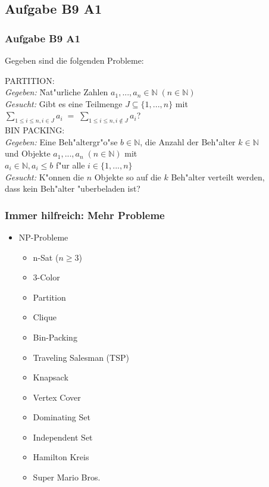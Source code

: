 \subsection{Aufgabe B9 A1}
\begin{frame}
	\frametitle{Aufgabe B9 A1}
	Gegeben sind die folgenden Probleme:
	\begin{tabbing}
	PARTITION:\\
	\textit{Gegeben:} \= Nat"urliche Zahlen $a_1,...,a_n \in \mathbb{N} \; (n \in
	\mathbb{N})$\\
	\textit{Gesucht:} \> Gibt es eine Teilmenge $J \subseteq \{1,...,n\}$ mit\\
	\> $\sum\limits_{1 \leq i \leq n, i \in J}a_i \; = \;
	\sum\limits_{1 \leq i \leq n, i \notin J}a_i$?\\[8pt]
	BIN PACKING:\\
	\textit{Gegeben:} \> Eine Beh"altergr"o"se $b \in \mathbb{N}$, die Anzahl der
	Beh"alter $k \in \mathbb{N}$\\
	\> und Objekte $a_1,...,a_n \; (n \in \mathbb{N})$ mit\\
	\> $a_i \in \mathbb{N}, a_i \leq b$ f"ur alle $i \in \{1,...,n\}$\\
	\textit{Gesucht:} \> K"onnen die $n$ Objekte so auf die $k$ Beh"alter verteilt
	werden,\\
	\> dass kein Beh"alter "uberbeladen ist?\\
	\end{tabbing}
\end{frame}

\begin{frame}
	\frametitle{Immer hilfreich: Mehr Probleme}
	\begin{itemize}
		\item NP-Probleme
		\begin{itemize}
			\item n-Sat ($n \geq 3$)
			\item 3-Color
			\item Partition
			\item Clique
			\item Bin-Packing
			\item Traveling Salesman (TSP)
			\item Knapsack
			\item Vertex Cover
			\item Dominating Set
			\item Independent Set
			\item Hamilton Kreis
			\item Super Mario Bros.
		\end{itemize}
	\end{itemize}
\end{frame}

